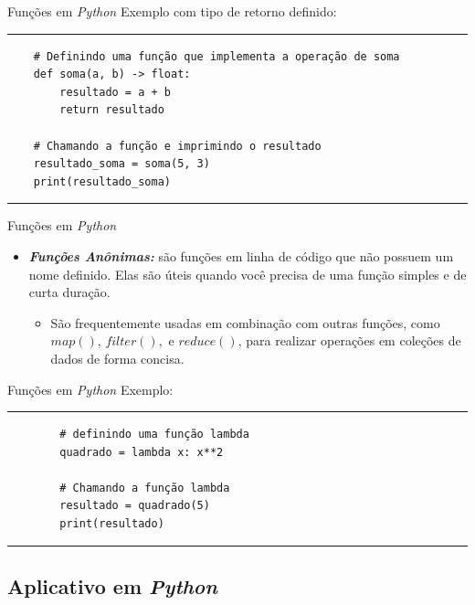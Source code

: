 \documentclass{beamer}
\begin{document}
\begin{frame}[fragile]{Funções em \textit{Python}}
Exemplo com tipo de retorno definido:
\rule{\textwidth}{1pt}
\scriptsize
\begin{verbatim}
	# Definindo uma função que implementa a operação de soma
	def soma(a, b) -> float:
		resultado = a + b
		return resultado
	
	# Chamando a função e imprimindo o resultado
	resultado_soma = soma(5, 3)
	print(resultado_soma)
\end{verbatim}
\rule{\textwidth}{1pt}
\end{frame}


\begin{frame}{Funções em \textit{Python}}
	\begin{itemize}
		\item \textbf{\textit{Funções Anônimas:}} são funções em linha de código que não possuem um nome definido. Elas são úteis quando você precisa de uma função simples e de curta duração.
		\begin{itemize}
			\item São frequentemente usadas em combinação com outras funções, como $map()$, $filter(),$ e $reduce()$, para realizar operações em coleções de dados de forma concisa.
		\end{itemize}
	\end{itemize}
\end{frame}

\begin{frame}[fragile]{Funções em \textit{Python}}
	Exemplo:
	\rule{\textwidth}{1pt}
	\scriptsize
	\begin{verbatim}
		# definindo uma função lambda
		quadrado = lambda x: x**2
		
		# Chamando a função lambda
		resultado = quadrado(5)
		print(resultado)
	\end{verbatim}
	\rule{\textwidth}{1pt}
\end{frame}

\subsection{Aplicativo em \textit{Python}}
\end{document}
